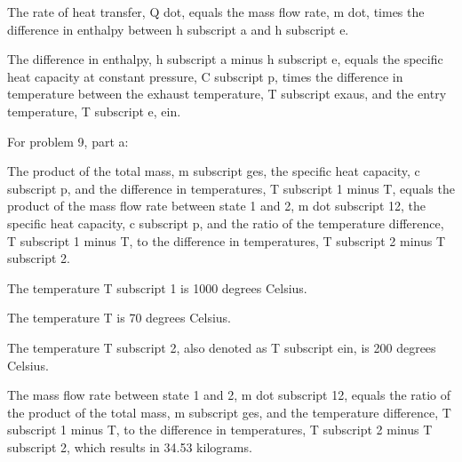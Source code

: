 The rate of heat transfer, Q dot, equals the mass flow rate, m dot, times the difference in enthalpy between h subscript a and h subscript e.

The difference in enthalpy, h subscript a minus h subscript e, equals the specific heat capacity at constant pressure, C subscript p, times the difference in temperature between the exhaust temperature, T subscript exaus, and the entry temperature, T subscript e, ein.

For problem 9, part a:

The product of the total mass, m subscript ges, the specific heat capacity, c subscript p, and the difference in temperatures, T subscript 1 minus T, equals the product of the mass flow rate between state 1 and 2, m dot subscript 12, the specific heat capacity, c subscript p, and the ratio of the temperature difference, T subscript 1 minus T, to the difference in temperatures, T subscript 2 minus T subscript 2.

The temperature T subscript 1 is 1000 degrees Celsius.

The temperature T is 70 degrees Celsius.

The temperature T subscript 2, also denoted as T subscript ein, is 200 degrees Celsius.

The mass flow rate between state 1 and 2, m dot subscript 12, equals the ratio of the product of the total mass, m subscript ges, and the temperature difference, T subscript 1 minus T, to the difference in temperatures, T subscript 2 minus T subscript 2, which results in 34.53 kilograms.